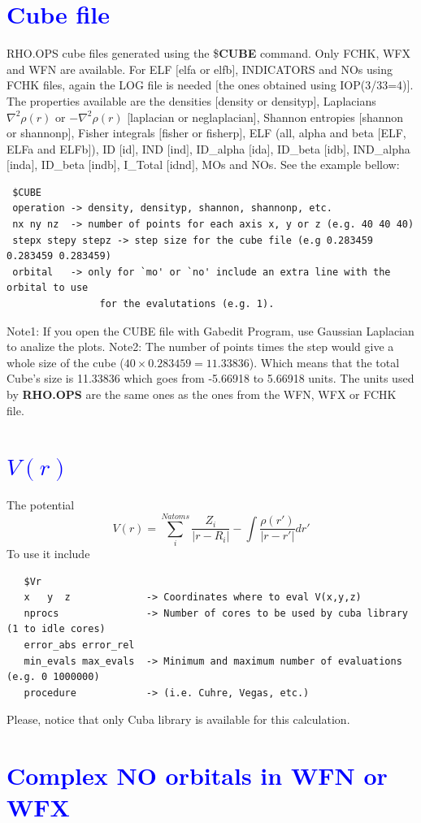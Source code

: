 \documentclass[10pt,a4paper]{article}
\newcommand{\tbl}[1]{{\textcolor{blue}{#1}}}
\begin{document}
{\section{\tbl{\textbf{Cube file}}}
\noindent RHO.OPS cube files generated using the \$\textbf{CUBE} command. Only FCHK, WFX and WFN are available. For ELF $[$elfa or elfb$]$, INDICATORS and NOs using FCHK files, again the LOG file is needed $[$the ones obtained using  IOP(3/33=4)$]$. The properties available are the densities $[$density or densityp$]$, Laplacians $\nabla ^2 \rho(r)$ or $-\nabla ^2 \rho(r)$  [laplacian or neglaplacian], Shannon entropies $[$shannon or shannonp$]$, Fisher integrals $[$fisher or fisherp$]$, ELF (all, alpha and beta $[$ELF, ELFa and ELFb$]$), ID $[$id$]$, IND $[$ind$]$, ID\_alpha $[$ida$]$, ID\_beta $[$idb$]$, IND\_alpha $[$inda$]$, ID\_beta $[$indb$]$, I\_Total $[$idnd$]$, MOs and NOs. See the example bellow:
\begin{verbatim}
 $CUBE
 operation -> density, densityp, shannon, shannonp, etc.
 nx ny nz  -> number of points for each axis x, y or z (e.g. 40 40 40)
 stepx stepy stepz -> step size for the cube file (e.g 0.283459 0.283459 0.283459)
 orbital   -> only for `mo' or `no' include an extra line with the orbital to use
                for the evalutations (e.g. 1). 
\end{verbatim}
\noindent Note1: If you open the CUBE file with Gabedit Program, use Gaussian Laplacian to analize the plots. 
\noindent Note2: The number of points times the step would give a whole size of the cube ($40\times0.283459=11.33836$). Which means that the total Cube's size is 11.33836 which goes from -5.66918 to 5.66918 units. The units used by {\bf RHO.OPS} are the same ones as the ones from the WFN, WFX or FCHK file. 
\section{\tbl{\textbf{$V(r)$}}}
The potential 
\begin{equation}
V(r)= \sum^{Natoms} _{i} \frac{Z_i}{|r-R_i|} - \int \frac{\rho(r')}{|r-r'|} dr'
\end{equation}
To use it include
\begin{verbatim}
   $Vr
   x   y  z             -> Coordinates where to eval V(x,y,z)
   nprocs               -> Number of cores to be used by cuba library (1 to idle cores) 
   error_abs error_rel    
   min_evals max_evals  -> Minimum and maximum number of evaluations (e.g. 0 1000000)
   procedure            -> (i.e. Cuhre, Vegas, etc.)
\end{verbatim}
Please, notice that only Cuba library is available for this calculation. 
\section{\tbl{Complex NO orbitals in WFN or WFX}}}
\end{document}
